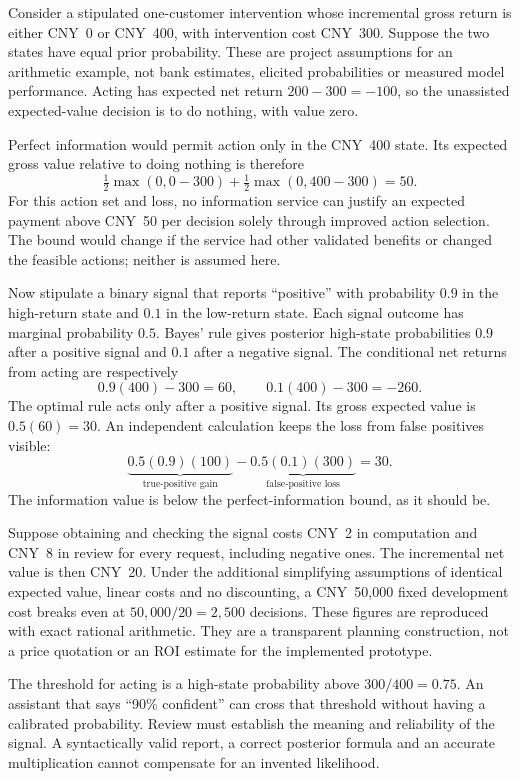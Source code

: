 Consider a stipulated one-customer intervention whose incremental gross return
is either CNY~0 or CNY~400, with intervention cost CNY~300. Suppose the two
states have equal prior probability. These are project assumptions for an
arithmetic example, not bank estimates, elicited probabilities or measured
model performance. Acting has expected net return $200-300=-100$, so the
unassisted expected-value decision is to do nothing, with value zero.

Perfect information would permit action only in the CNY~400 state. Its expected
gross value relative to doing nothing is therefore
\[
 \tfrac12\max(0,0-300)+\tfrac12\max(0,400-300)=50.
\]
For this action set and loss, no information service can justify an expected
payment above CNY~50 per decision solely through improved action selection.
The bound would change if the service had other validated benefits or changed
the feasible actions; neither is assumed here.

Now stipulate a binary signal that reports ``positive'' with probability $0.9$
in the high-return state and $0.1$ in the low-return state. Each signal outcome
has marginal probability $0.5$. Bayes' rule gives posterior high-state
probabilities $0.9$ after a positive signal and $0.1$ after a negative signal.
The conditional net returns from acting are respectively
\[
 0.9(400)-300=60,\qquad 0.1(400)-300=-260.
\]
The optimal rule acts only after a positive signal. Its gross expected value
is $0.5(60)=30$. An independent calculation keeps the loss from false positives
visible:
\[
 \underbrace{0.5(0.9)(100)}_{\text{true-positive gain}}
 -\underbrace{0.5(0.1)(300)}_{\text{false-positive loss}}=30.
\]
The information value is below the perfect-information bound, as it should be.

Suppose obtaining and checking the signal costs CNY~2 in computation and CNY~8
in review for every request, including negative ones. The incremental net value
is then CNY~20. Under the additional simplifying assumptions of identical
expected value, linear costs and no discounting, a CNY~50,000 fixed development
cost breaks even at $50{,}000/20=2{,}500$ decisions. These figures are reproduced
with exact rational arithmetic. They are a transparent planning construction,
not a price quotation or an ROI estimate for the implemented prototype.

The threshold for acting is a high-state probability above $300/400=0.75$.
An assistant that says ``90\% confident'' can cross that threshold without
having a calibrated probability. Review must establish the meaning and
reliability of the signal. A syntactically valid report, a correct posterior
formula and an accurate multiplication cannot compensate for an invented
likelihood.

